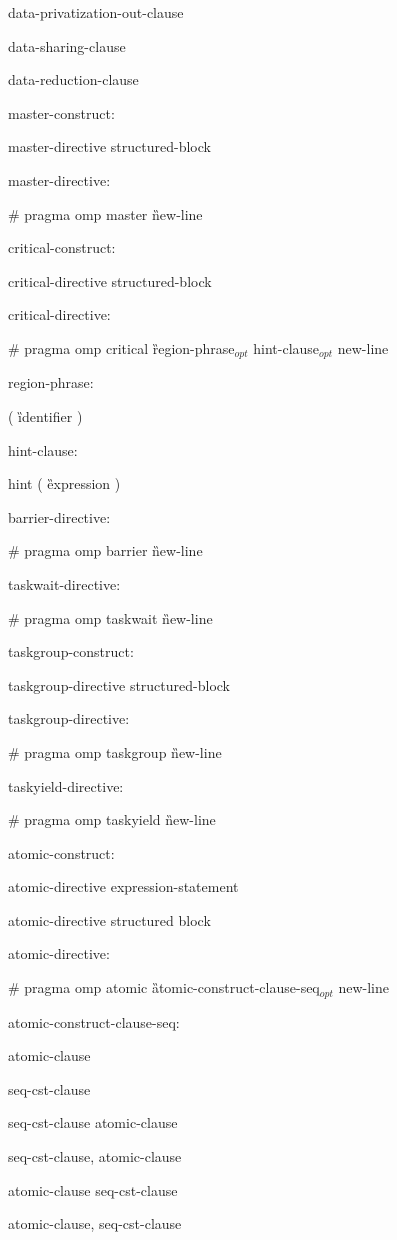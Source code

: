 {\I data-privatization-out-clause 

\I data-sharing-clause 

\I data-reduction-clause 

master-construct:

\I master-directive structured-block

master-directive:

\C\I \# pragma omp master \G new-line

critical-construct:

\I critical-directive structured-block

critical-directive:

\C\I \# pragma omp critical \G region-phrase$_{opt}$ hint-clause$_{opt}$ new-line

region-phrase:

\C\I ( \G identifier \C )

hint-clause: 

\C\I hint ( \G expression \C )

barrier-directive:

\C\I \# pragma omp barrier \G new-line

taskwait-directive:

\C\I \# pragma omp taskwait \G new-line

taskgroup-construct:

\I taskgroup-directive structured-block

taskgroup-directive:

\C\I \# pragma omp taskgroup \G new-line

taskyield-directive:

\C\I \# pragma omp taskyield \G new-line

atomic-construct:

\I atomic-directive expression-statement

\I atomic-directive structured block

atomic-directive:

\C\I \# pragma omp atomic \G atomic-construct-clause-seq$_{opt}$ new-line

atomic-construct-clause-seq:

\I atomic-clause

\I seq-cst-clause

\I seq-cst-clause atomic-clause

\I seq-cst-clause, atomic-clause

\I atomic-clause seq-cst-clause 

\I atomic-clause, seq-cst-clause 

}
